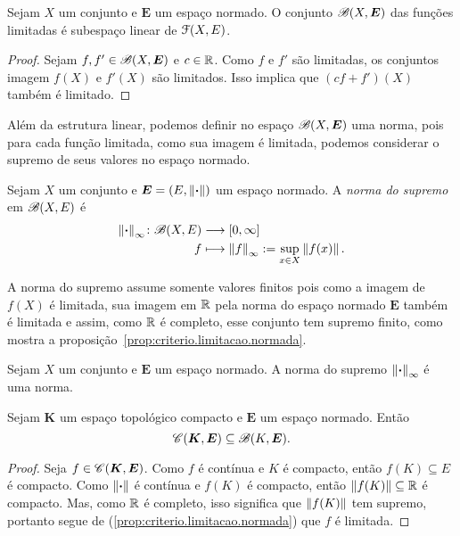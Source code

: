 \begin{proposition}
Sejam $X$ um conjunto e $\bm E$ um espaço normado. O conjunto $\mathscr{B}(X,\bm E)$ das funções limitadas é subespaço linear de $\mathcal{F}(X,E)$.
\end{proposition}
\begin{proof}
Sejam $f,f' \in \mathscr{B}(X,\bm E)$ e $c \in \mathbb{R}$. Como $f$ e $f'$ são limitadas, os conjuntos imagem $f(X)$ e $f'(X)$ são limitados. Isso implica que $(cf+f')(X)$ também é limitado.
\end{proof}

Além da estrutura linear, podemos definir no espaço $\mathscr{B}(X,\bm E)$ uma norma, pois para cada função limitada, como sua imagem é limitada, podemos considerar o supremo de seus valores no espaço normado.

\begin{definition}
Sejam $X$ um conjunto e $\bm E = (E, \left\Vert{\bm{\cdot}}\right\Vert)$ um espaço normado. A \emph{norma do supremo} em $\mathscr{B}(X,E)$ é
	\begin{align*}
	{\left\Vert{\bm{\cdot}}\right\Vert_{\infty}}\colon {\mathscr{B}(X,E)} &\longrightarrow {\left[0,\allowbreak \infty\right]} \\{f} &\longmapsto \left\Vert{f}\right\Vert_{\infty} := \sup_{x \in X} \left\Vert{f(x)}\right\Vert.
	\end{align*}
\end{definition}

A norma do supremo assume somente valores finitos pois como a imagem de $f(X)$ é limitada, sua imagem em $\mathbb{R}$ pela norma do espaço normado $\bm E$ também é limitada e assim, como $\mathbb{R}$ é completo, esse conjunto tem supremo finito, como mostra a proposição~\ref{prop:criterio.limitacao.normada}.

\begin{exercise}
Sejam $X$ um conjunto e $\bm E$ um espaço normado. A norma do supremo $\left\Vert{\bm{\cdot}}\right\Vert_{\infty}$ é uma norma.
\end{exercise}

\begin{proposition}
\label{prop:funcao.continua.compacto.limitada}
Sejam $\bm K$ um espaço topológico compacto e $\bm E$ um espaço normado. Então
	\begin{equation*}
	\mathscr{C}(\bm K,\bm E) \subseteq \mathscr{B}(K, \bm E).
	\end{equation*}
\end{proposition}
\begin{proof}
Seja $f \in \mathscr{C}(\bm K, \bm E)$. Como $f$ é contínua e $K$ é compacto, então $f(K) \subseteq E$ é compacto. Como $\left\Vert{\bm{\cdot}}\right\Vert$ é contínua e $f(K)$ é compacto, então $\left\Vert{f(K)}\right\Vert \subseteq \mathbb{R}$ é compacto. Mas, como $\mathbb{R}$ é completo, isso significa que $\left\Vert{f(K)}\right\Vert$ tem supremo, portanto segue de (\ref{prop:criterio.limitacao.normada}) que $f$ é limitada.
\end{proof}

